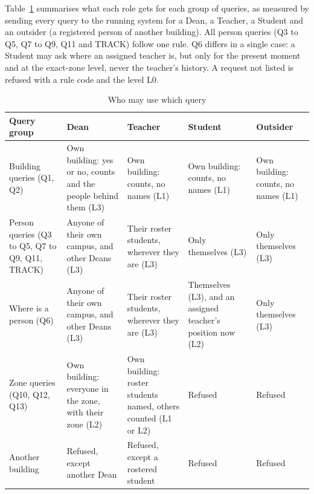 \documentclass[12pt,a4paper,oneside]{report}
\begin{document}
Table~\ref{tab:qaccess} summarises what each role gets for each group of queries, as measured by sending every query to the running system for a Dean, a Teacher, a Student and an outsider (a registered person of another building). All person queries (Q3 to Q5, Q7 to Q9, Q11 and TRACK) follow one rule. Q6 differs in a single case: a Student may ask where an assigned teacher is, but only for the present moment and at the exact-zone level, never the teacher's history. A request not listed is refused with a rule code and the level L0.

\begin{table}[htbp]
\centering
\caption{Who may use which query}\label{tab:qaccess}
{\footnotesize\setlength{\tabcolsep}{3pt}\renewcommand{\arraystretch}{1.15}
\begin{tabular}{|p{2.3cm}|p{3.2cm}|p{3.2cm}|p{3.2cm}|p{2.6cm}|}\hline
\textbf{Query group} & \textbf{Dean} & \textbf{Teacher} & \textbf{Student} & \textbf{Outsider}\\\hline
Building queries (Q1, Q2) & Own building: yes or no, counts and the people behind them (L3) & Own building: counts, no names (L1) & Own building: counts, no names (L1) & Own building: counts, no names (L1)\\\hline
Person queries (Q3 to Q5, Q7 to Q9, Q11, TRACK) & Anyone of their own campus, and other Deans (L3) & Their roster students, wherever they are (L3) & Only themselves (L3) & Only themselves (L3)\\\hline
Where is a person (Q6) & Anyone of their own campus, and other Deans (L3) & Their roster students, wherever they are (L3) & Themselves (L3), and an assigned teacher's position now (L2) & Only themselves (L3)\\\hline
Zone queries (Q10, Q12, Q13) & Own building: everyone in the zone, with their zone (L2) & Own building: roster students named, others counted (L1 or L2) & Refused & Refused\\\hline
Another building & Refused, except another Dean & Refused, except a rostered student & Refused & Refused\\\hline
\end{tabular}}
\end{table}
\end{document}

